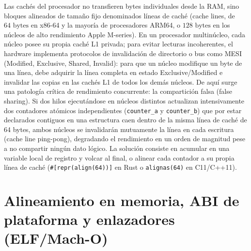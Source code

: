 \documentclass{book}
\begin{document}
Las cachés del procesador no transfieren bytes individuales desde la RAM, sino bloques alineados de tamaño fijo denominados líneas de caché (cache lines, de \(64\text{ bytes}\) en x86-64 y la mayoría de procesadores ARM64, o \(128\text{ bytes}\) en los núcleos de alto rendimiento Apple M-series). En un procesador multinúcleo, cada núcleo posee su propia caché L1 privada; para evitar lecturas incoherentes, el hardware implementa protocolos de invalidación de directorio o bus como MESI (Modified, Exclusive, Shared, Invalid): para que un núcleo modifique un byte de una línea, debe adquirir la línea completa en estado Exclusive/Modified e invalidar las copias en las cachés L1 de todos los demás núcleos.
De aquí surge una patología crítica de rendimiento concurrente: la compartición falsa (false sharing). Si dos hilos ejecutándose en núcleos distintos actualizan intensivamente dos contadores atómicos independientes (\texttt{counter\_a} y \texttt{counter\_b}) que por estar declarados contiguos en una estructura caen dentro de la misma línea de caché de 64 bytes, ambos núcleos se invalidarán mutuamente la línea en cada escritura (cache line ping-pong), degradando el rendimiento en un orden de magnitud pese a no compartir ningún dato lógico. La solución consiste en acumular en una variable local de registro y volcar al final, o alinear cada contador a su propia línea de caché (\texttt{\#[repr(align(64))]} en Rust o \texttt{alignas(64)} en C11/C++11).

\section{Alineamiento en memoria, ABI de plataforma y enlazadores (ELF/Mach-O)}
\end{document}

